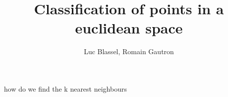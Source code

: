 \documentclass[11 pt]{beamer}
\title{Classification of points in a euclidean space}
\author{Luc Blassel, Romain Gautron}
\begin{document}
\maketitle
\begin{}

\end{}
\begin{frame}{how do we find the k nearest neighbours}

\end{frame}
\end{document}
